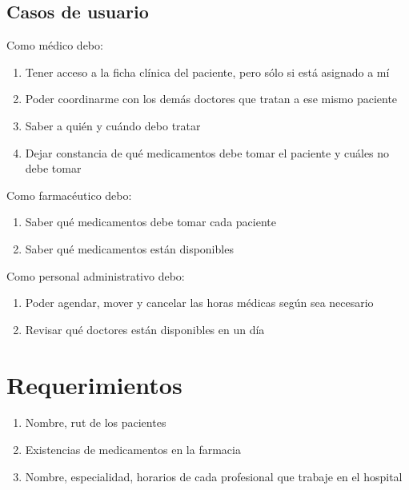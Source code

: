 \documentclass{article}
\begin{document}
\subsection*{Casos de usuario}
Como médico debo:
\begin{enumerate}
    \item{Tener acceso a la ficha clínica del paciente, pero sólo si está asignado a mí}
    \item{Poder coordinarme con los demás doctores que tratan a ese mismo paciente}
    \item{Saber a quién y cuándo debo tratar}
    \item{Dejar constancia de qué medicamentos debe tomar el paciente y cuáles no debe tomar}
\end{enumerate}
\vspace{5mm}
Como farmacéutico debo:
\begin{enumerate}
    \item{Saber qué medicamentos debe tomar cada paciente}
    \item{Saber qué medicamentos están disponibles}
\end{enumerate}
\vspace{5mm}
Como personal administrativo debo:
\begin{enumerate}
    \item{Poder agendar, mover y cancelar las horas médicas según sea necesario}
    \item{Revisar qué doctores están disponibles en un día}
\end{enumerate}

\section{Requerimientos}
\begin{enumerate}
    \item{Nombre, rut de los pacientes}
    \item{Existencias de medicamentos en la farmacia}
    \item{Nombre, especialidad, horarios de cada profesional que trabaje en el hospital}
\end{enumerate}
\end{document}
